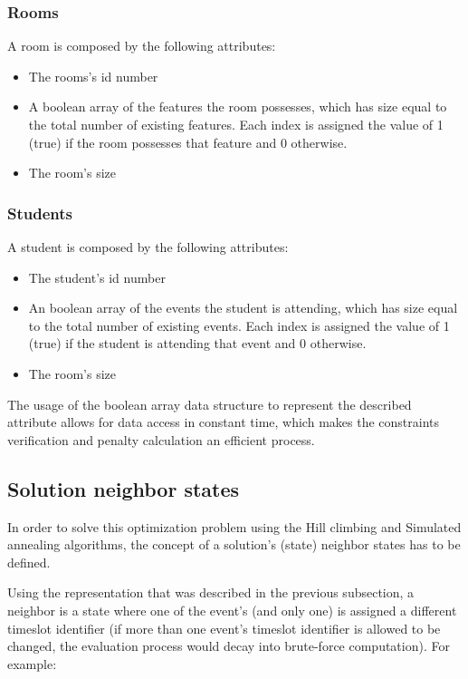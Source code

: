 \documentclass[conference]{IEEEtran}
\begin{document}
\subsubsection{Rooms}

A room is composed by the following attributes:
\begin{itemize}
    \item The rooms's id number
    \item A boolean array of the features the room possesses, which has size equal to the total number of existing features. Each index is assigned the value of 1 (true) if the room possesses that feature and 0 otherwise.
    \item The room's size
\end{itemize}

\subsubsection{Students}

A student is composed by the following attributes:
\begin{itemize}
    \item The student's id number
    \item An boolean array of the events the student is attending, which has size equal to the total number of existing events. Each index is assigned the value of 1 (true) if the student is attending that event and 0 otherwise.
    \item The room's size
\end{itemize}

The usage of the boolean array data structure to represent the described attribute allows for data access in constant time, which makes the constraints verification and penalty calculation an efficient process. 

\subsection{Solution neighbor states}

In order to solve this optimization problem using the Hill climbing and Simulated annealing algorithms, the concept of a solution's (state) neighbor states has to be defined.

Using the representation that was described in the previous subsection, a neighbor is a state where one of the event's (and only one) is assigned a different timeslot identifier (if more than one event's timeslot identifier is allowed to be changed, the evaluation process would decay into brute-force computation). For example:
\end{document}
